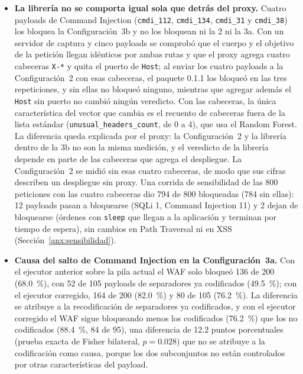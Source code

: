 \begin{itemize}
    La atribución al WAF coincide, categoría por categoría, con lo medido por separado en la 3a,
    pero no es un cruce determinista.
    \item \textbf{La librería no se comporta igual sola que detrás del proxy.} Cuatro payloads de
    Command Injection (\texttt{cmdi\_112}, \texttt{cmdi\_134}, \texttt{cmdi\_31} y
    \texttt{cmdi\_38}) los bloquea la Configuración~3b y no los bloquean ni la 2 ni la 3a. Con
    un servidor de captura y cinco payloads se comprobó que el cuerpo y el objetivo de la petición
    llegan idénticos por ambas rutas y que el proxy agrega cuatro cabeceras \texttt{X-*} y quita el
    puerto de \texttt{Host}; al
    enviar los cuatro payloads a la Configuración~2 con esas cabeceras, el paquete 0.1.1 los
    bloqueó en las tres repeticiones, y sin ellas no bloqueó ninguno, mientras que agregar además
    el \texttt{Host} sin puerto no cambió ningún veredicto. Con las cabeceras, la única
    característica del vector que cambia es el recuento de cabeceras fuera de la lista estándar
    (\texttt{unusual\_headers\_count}, de 0 a 4), que usa el Random Forest. La diferencia queda
    explicada por el proxy: la Configuración~2 y la librería dentro de la 3b no son la misma
    medición, y el veredicto de la librería depende en parte de las cabeceras que agrega el
    despliegue. La Configuración~2 se midió sin esas cuatro cabeceras, de modo que sus cifras
    describen un despliegue sin proxy. Una corrida de sensibilidad de las 800 peticiones con las
    cuatro cabeceras dio 794 de 800 bloqueadas (784 sin ellas): 12 payloads pasan a bloquearse
    (SQLi 1, Command Injection 11) y 2 dejan de bloquearse (órdenes con \texttt{sleep} que llegan a
    la aplicación y terminan por tiempo de espera), sin cambios en Path Traversal ni en XSS
    (Sección~\ref{anx:sensibilidad}).
    \item \textbf{Causa del salto de Command Injection en la Configuración~3a.} Con el ejecutor
    anterior sobre la pila actual el WAF solo bloqueó 136 de 200 (68.0~\%), con 52 de 105 payloads
    de separadores ya codificados (49.5~\%); con el ejecutor corregido, 164 de 200 (82.0~\%) y 80 de
    105 (76.2~\%). La diferencia se atribuye a la recodificación de separadores ya codificados, y
    con el ejecutor corregido el WAF sigue bloqueando menos los codificados (76.2~\%) que los
    no codificados (88.4~\%, 84 de 95), una diferencia de 12.2 puntos porcentuales (prueba exacta de
    Fisher bilateral, $p = 0.028$) que no se atribuye a la codificación como causa, porque los dos
    subconjuntos no están controlados por otras características del payload.

\end{itemize}
